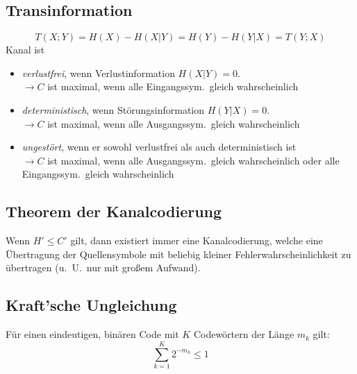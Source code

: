 \subsection*{Transinformation}
\[
    T(X; Y) = H(X) - H(X | Y) = H(Y) - H(Y | X) = T(Y; X)
\]
Kanal ist 
\begin{itemize}
	\setlength{\parskip}{0pt}
	\setlength{\itemsep}{0pt plus 1pt}
    \item \textit{verlustfrei}, wenn Verlustinformation $ H(X | Y) = 0. $ \\
        $ \rightarrow C $ ist maximal, wenn alle Eingangssym.\ gleich
        wahrscheinlich
    \item \textit{deterministisch}, wenn Störungsinformation $ H(Y | X) = 0. $ \\
        $ \rightarrow C $ ist maximal, wenn alle Ausgangssym.\ gleich
        wahrscheinlich
    \item \textit{ungestört}, wenn er sowohl verlustfrei als auch
        deterministisch ist \\
        $ \rightarrow C $ ist maximal, wenn alle Ausgangssym.\ gleich
        wahrscheinlich oder alle Eingangssym.\ gleich wahrscheinlich
\end{itemize}

\subsection*{Theorem der Kanalcodierung}
Wenn $ H' \leq C' $ gilt, dann existiert immer eine Kanalcodierung, welche eine
Übertragung der Quellensymbole mit beliebig kleiner Fehlerwahrscheinlichkeit
zu übertragen (u.\ U.\ nur mit großem Aufwand).

\subsection*{Kraft'sche Ungleichung}
Für einen eindeutigen, binären Code mit $ K $ Codewörtern der Länge $ m_k $ gilt:
\[
    \sum_{k=1}^{K} 2^{-m_k} \le 1
\]

